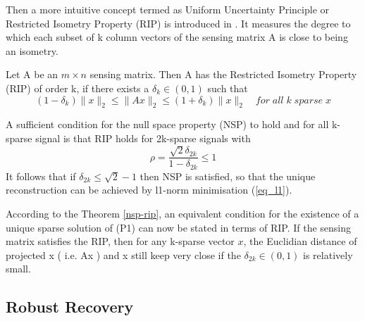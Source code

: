 Then a more intuitive concept termed as Uniform Uncertainty Principle or Restricted Isometry Property (RIP) is introduced in \cite{candes2006robust}. It measures the degree to which each subset of k column vectors of the sensing matrix A is close to being an isometry.
\begin{Def}
\label{rip-def}
Let A be an $m \times n$ sensing matrix. Then A has the Restricted Isometry Property (RIP) of order k, if there exists a $\delta_k \in (0, 1)$ such that
\begin{equation}
(1-\delta_k)\|x\|_2 \leq \|Ax\|_2 \leq (1+\delta_k)\|x\|_2 \quad for \; all \; k\; sparse \; x
\end{equation}
\end{Def}
\begin{theorem}
\label{nsp-rip}
A sufficient condition for the null space property (NSP) to hold and for all k-sparse signal is that RIP holds for 2k-sparse signals with
\begin{equation}
\rho = \frac{\sqrt{2} \delta_{2k}}{1-\delta_{2k}} \leq 1
\end{equation}
It follows that if $\delta_{2k} \leq \sqrt{2}-1$ then NSP is satisfied, so that the unique reconstruction can be achieved by l1-norm minimisation (\ref{eq_l1}).
\end{theorem}
According to the Theorem \ref{nsp-rip}, an equivalent condition for the existence of a unique sparse solution of (P1) can now be stated in terms of RIP. If the sensing matrix satisfies the RIP, then for any k-sparse vector $x$, the Euclidian distance of projected x ( i.e. Ax ) and x still keep very close if the $\delta_{2k} \in (0,1)$ is relatively small.

\subsection{Robust Recovery}

